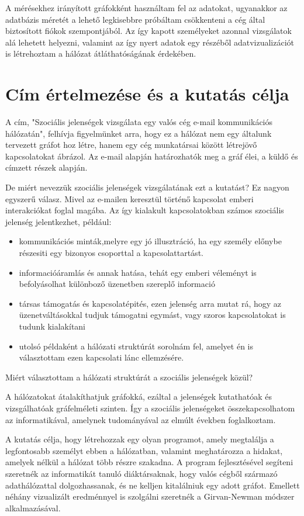 A mérésekhez irányított gráfokként használtam fel az adatokat, ugyanakkor az adatbázis méretét a lehető legkisebbre próbáltam csökkenteni a cég által biztosított fiókok szempontjából. Az így kapott személyeket azonnal vizsgálatok alá lehetett helyezni, valamint az így nyert adatok egy részéből adatvizualizációt is létrehoztam a hálózat átláthatóságának érdekében.

\section{Cím értelmezése és a kutatás célja} 



A cím, "Szociális jelenségek vizsgálata egy valós cég e-mail kommunikációs hálózatán", felhívja figyelmünket arra, hogy ez a hálózat nem egy általunk tervezett gráfot hoz létre, hanem egy cég munkatársai között létrejövő kapcsolatokat ábrázol. Az e-mail alapján határozhatók meg a gráf élei, a küldő és címzett részek alapján.

De miért nevezzük szociális jelenségek vizsgálatának ezt a kutatást?
Ez nagyon egyszerű válasz. Mivel az e-mailen keresztül történő kapcsolat emberi interakciókat foglal magába. Az így kialakult kapcsolatokban számos szociális jelenség jelentkezhet, például:
\begin{itemize}
    \item kommunikációs minták,melyre egy jó illusztráció, ha egy személy előnybe részesiti egy bizonyos csoporttal a kapcsolattartást.
    \item informacióáramlás és annak hatása, tehát egy emberi véleményt is befolyásolhat különboző  üzenetben szereplő informació
    \item társas támogatás és kapcsolatépités, ezen jelenség  arra mutat rá, hogy az üzenetváltásokkal tudjuk támogatni egymást, vagy szoros kapcsolatokat is tudunk kialakítani
    \item utolsó példaként a hálózati struktúrát sorolnám fel, amelyet én is választottam ezen kapcsolati lánc ellemzésére.
\end{itemize}


Miért választottam a hálózati struktúrát a szociális jelenségek közül?

A hálózatokat átalakíthatjuk gráfokká, ezáltal a jelenségek kutathatóak és vizsgálhatóak gráfelméleti szinten. Így a szociális jelenségeket összekapcsolhatom az informatikával, amelynek tudományával az elmúlt években foglalkoztam.

A kutatás célja, hogy létrehozzak egy olyan programot, amely megtalálja a legfontosabb személyt ebben a hálózatban, valamint meghatározza a hidakat, amelyek nélkül a hálózat több részre szakadna. A program fejlesztésével segíteni szeretnék az informatikát tanuló diáktársaknak, hogy valós cégből származó adathálózattal dolgozhassanak, és ne kelljen kitalálniuk egy adott gráfot. Emellett néhány vizualizált eredménnyel is szolgálni szeretnék a Girvan-Newman módszer alkalmazásával.
